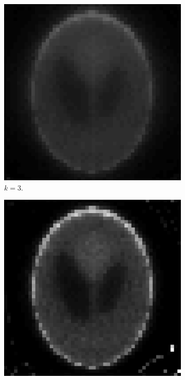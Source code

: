\documentclass[letterpaper,12pt]{article}
\theoremstyle{plain}
\begin{document}
\begin{figure}[H]
   \centering
      \begin{subfigure}[h]{0.32\linewidth}
         \centering
         \includegraphics[width=\textwidth]{Figuras/em_k=3.png}
         \caption{$k=3$.}
         \label{fig:3}
      \end{subfigure}
        \begin{subfigure}[h]{0.32\linewidth}
         \centering
         \includegraphics[width=\textwidth]{Figuras/em_k=9.png}

\end{subfigure}
\end{figure}
\end{document}
